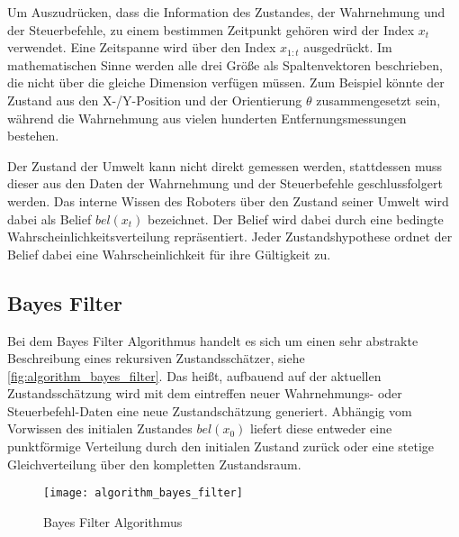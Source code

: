 Um Auszudrücken, dass die Information des Zustandes, der Wahrnehmung und der Steuerbefehle, zu einem bestimmen Zeitpunkt gehören wird der Index $x_t$ verwendet. Eine Zeitspanne wird über den Index $x_{1:t}$ ausgedrückt. Im mathematischen Sinne werden alle drei Größe als Spaltenvektoren beschrieben, die nicht über die gleiche Dimension verfügen müssen. Zum Beispiel könnte der Zustand aus den X-/Y-Position und der Orientierung $\theta$ zusammengesetzt sein, während die Wahrnehmung aus vielen hunderten Entfernungsmessungen bestehen.

Der Zustand der Umwelt kann nicht direkt gemessen werden, stattdessen muss dieser aus den Daten der Wahrnehmung und der Steuerbefehle geschlussfolgert werden. Das interne Wissen des Roboters über den Zustand seiner Umwelt wird dabei als Belief $bel(x_t)$ bezeichnet. Der Belief wird dabei durch eine bedingte Wahrscheinlichkeitsverteilung repräsentiert. Jeder Zustandshypothese ordnet der Belief dabei eine Wahrscheinlichkeit für ihre Gültigkeit zu.


%
%
\subsection{Bayes Filter}

Bei dem Bayes Filter Algorithmus handelt es sich um einen sehr abstrakte Beschreibung eines rekursiven Zustandsschätzer, siehe \autoref{fig:algorithm_bayes_filter}. Das heißt, aufbauend  auf der aktuellen Zustandsschätzung wird mit dem eintreffen neuer Wahrnehmungs- oder Steuerbefehl-Daten eine neue Zustandschätzung generiert. Abhängig vom Vorwissen des initialen Zustandes $bel(x_0)$ liefert diese entweder eine punktförmige Verteilung durch den initialen Zustand zurück oder eine stetige Gleichverteilung über den kompletten Zustandsraum. 

\begin{figure}
	\centering
	\texttt{[image: algorithm\_bayes\_filter]}
	\caption{Bayes Filter Algorithmus \cite{thrun2005probabilistic}}
	\label{fig:algorithm_bayes_filter}
\end{figure}

